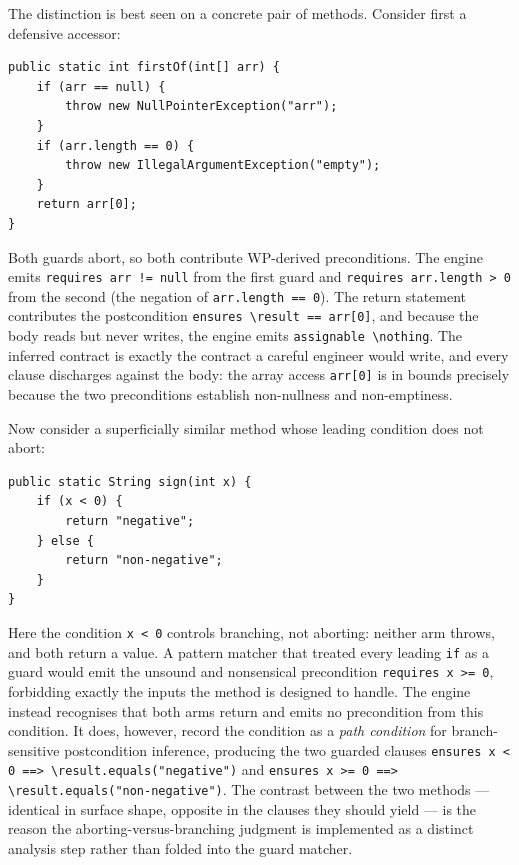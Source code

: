 The distinction is best seen on a concrete pair of methods. Consider first a
defensive accessor:

\begin{lstlisting}
public static int firstOf(int[] arr) {
    if (arr == null) {
        throw new NullPointerException("arr");
    }
    if (arr.length == 0) {
        throw new IllegalArgumentException("empty");
    }
    return arr[0];
}
\end{lstlisting}

Both guards abort, so both contribute WP-derived preconditions. The engine
emits \texttt{requires arr != null} from the first guard and
\texttt{requires arr.length > 0} from the second (the negation of
\texttt{arr.length == 0}). The return statement contributes the postcondition
\texttt{ensures \textbackslash result == arr[0]}, and because the body reads but
never writes, the engine emits \texttt{assignable \textbackslash nothing}. The
inferred contract is exactly the contract a careful engineer would write, and
every clause discharges against the body: the array access \texttt{arr[0]} is
in bounds precisely because the two preconditions establish non-nullness and
non-emptiness.

Now consider a superficially similar method whose leading condition does not
abort:

\begin{lstlisting}
public static String sign(int x) {
    if (x < 0) {
        return "negative";
    } else {
        return "non-negative";
    }
}
\end{lstlisting}

Here the condition \texttt{x < 0} controls branching, not aborting: neither arm
throws, and both return a value. A pattern matcher that treated every leading
\texttt{if} as a guard would emit the unsound and nonsensical precondition
\texttt{requires x >= 0}, forbidding exactly the inputs the method is designed
to handle. The engine instead recognises that both arms return and emits no
precondition from this condition. It does, however, record the condition as a
\emph{path condition} for branch-sensitive postcondition inference, producing
the two guarded clauses
\texttt{ensures x < 0 ==> \textbackslash result.equals("negative")} and
\texttt{ensures x >= 0 ==> \textbackslash result.equals("non-negative")}. The
contrast between the two methods --- identical in surface shape, opposite in the
clauses they should yield --- is the reason the aborting-versus-branching
judgment is implemented as a distinct analysis step rather than folded into the
guard matcher.

